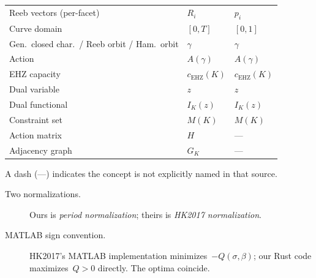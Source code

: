 \begin{longtable}{p{5.3cm} p{3.4cm} p{3.4cm}}
Reeb vectors (per-facet)                         & $R_i$                & $p_i$ \\
Curve domain                                     & $[0,T]$              & $[0,1]$ \\
Gen.\ closed char.\ / Reeb orbit / Ham.\ orbit  & $\gamma$             & $\gamma$ \\
Action                                           & $A(\gamma)$          & $A(\gamma)$ \\
EHZ capacity                                     & $c_\mathrm{EHZ}(K)$ & $c_\mathrm{EHZ}(K)$ \\
Dual variable                                    & $z$                  & $z$ \\
Dual functional                                  & $I_K(z)$             & $I_K(z)$ \\
Constraint set                                   & $M(K)$               & $M(K)$ \\
Action matrix                                    & $H$                  & --- \\
Adjacency graph                                  & $G_K$                & --- \\

\bottomrule
\end{longtable}

A dash (---) indicates the concept is not explicitly named in that source.



\begin{description}

\item[Two normalizations.]
  Ours is \emph{period normalization};
  theirs is \emph{HK2017 normalization}.

\item[MATLAB sign convention.]
  HK2017's MATLAB implementation minimizes~$-Q(\sigma,\beta)$; our Rust code maximizes~$Q > 0$ directly. The optima coincide.

\end{description}
